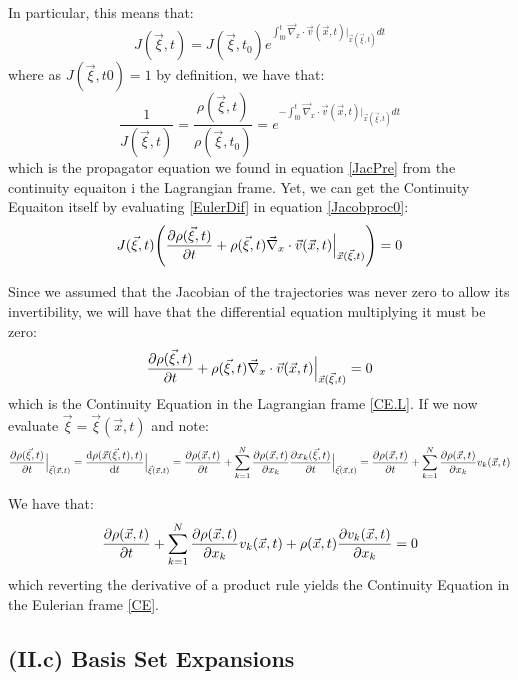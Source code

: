 \documentclass[11pt, a4paper]{article} %
\DeclareRobustCommand{\mybox}[2][gray!20]{%
\begin{tcolorbox}[   %
        left=1cm,
        right=1cm,
        top=0.5cm,
        bottom=0.5cm,
        colback=#1,
        colframe=#1,
        width=\dimexpr\textwidth\relax, 
        enlarge left by=0mm,
        boxsep=5pt,
        arc=0pt,outer arc=0pt,
        ]
        #2
\end{tcolorbox}
}
\begin{document}
\mybox{
In particular, this means that:
\begin{equation}
J(\vec{\xi},t)=J(\vec{\xi},t_0)e^{\int_{t0}^t \vec{\nabla}_x\cdot\vec{v}(\vec{x},t)\Big\rvert_{\vec{x}(\vec{\xi},t)}dt}
\end{equation}
where as $J(\vec{\xi},t0)=1$ by definition, we have that:
\begin{equation}
\frac{1}{J(\vec{\xi},t)}=\frac{\rho(\vec{\xi},t)}{\rho(\vec{\xi},t_0)}=e^{-\int_{t0}^t \vec{\nabla}_x\cdot\vec{v}(\vec{x},t)\Big\rvert_{\vec{x}(\vec{\xi},t)}dt}
\end{equation}
which is the propagator equation we found in equation \eqref{JacPre} from the continuity equaiton i the Lagrangian frame. Yet, we can get the Continuity Equaiton itself by evaluating \eqref{EulerDif} in equation \eqref{Jacobproc0}:
\begin{equation}
J(\vec{\xi},t)\qty(\pdv{\rho(\vec{\xi},t)}{t}+\rho(\vec{\xi},t)\vec{\nabla}_x\cdot\vec{v}(\vec{x},t)\Big\rvert_{\vec{x}(\vec{\xi},t)})=0
\end{equation}

Since we assumed that the Jacobian of the trajectories was never zero to allow its invertibility, we will have that the differential equation multiplying it must be zero:
\begin{equation}
\pdv{\rho(\vec{\xi},t)}{t}+\rho(\vec{\xi},t)\vec{\nabla}_x\cdot\vec{v}(\vec{x},t)\Big\rvert_{\vec{x}(\vec{\xi},t)}=0
\end{equation}
which is the Continuity Equation in the Lagrangian frame \eqref{CE.L}. If we now evaluate $\vec{\xi}=\vec{\xi}(\vec{x},t)$ and note:
\begin{equation}
\pdv{\rho(\vec{\xi},t)}{t}\Big\rvert_{\vec{\xi}(\vec{x},t)}=\dv{\rho(\vec{x}(\vec{\xi},t),t)}{t}\Big\rvert_{\vec{\xi}(\vec{x},t)}=\pdv{\rho(\vec{x},t)}{t}+\sum_{k=1}^N\pdv{\rho(\vec{x},t)}{x_k}\pdv{x_k(\vec{\xi},t)}{t}\Big\rvert_{\vec{\xi}(\vec{x},t)}=\pdv{\rho(\vec{x},t)}{t}+\sum_{k=1}^N\pdv{\rho(\vec{x},t)}{x_k}v_k(\vec{x},t)
\end{equation}

We have that:
\begin{equation}
\pdv{\rho(\vec{x},t)}{t}+\sum_{k=1}^N\pdv{\rho(\vec{x},t)}{x_k}v_k(\vec{x},t)+\rho(\vec{x},t)\pdv{v_k(\vec{x},t)}{x_k}=0
\end{equation}
which reverting the derivative of a product rule yields the Continuity Equation in the Eulerian frame \eqref{CE}.


}


\subsection*{(II.c) Basis Set Expansions}
\end{document}
